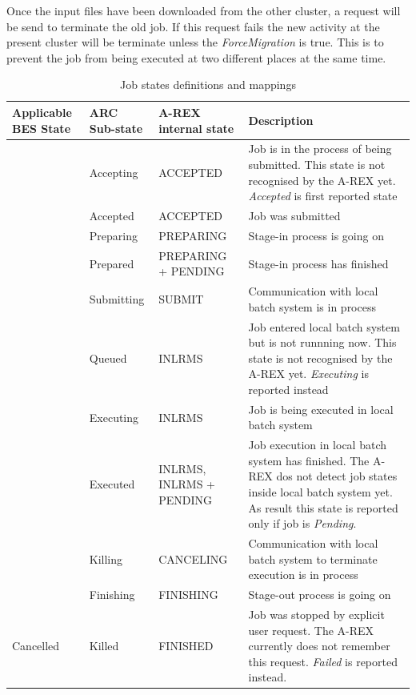 \documentclass{article}                            %
\begin{document}
Once the input files have been downloaded from the other cluster, a request will be send 
to terminate the old job. If this request fails the new activity at the present cluster 
will be terminate unless the \emph{ForceMigration} is true. This is to prevent the job 
from being executed at two different places at the same time.

%
\begin{table}

\caption{\label{tab:Job-states-definitions}Job states definitions and mappings}

\begin{tabular}{|>{\centering}p{}|>{\centering}p{}|>{\centering}p{}|p{}|}
\hline 
Applicable BES State&
ARC Sub-state&
A-REX internal state&
Description\tabularnewline
\hline
\hline 
\multirow{2}{*}{Pending}& Accepting& ACCEPTED &
Job is in the process of being submitted. This state is not recognised
by the A-REX yet. \emph{Accepted} is first reported state\\ \cline{2-4}
&Accepted& ACCEPTED& Job was submitted\\ \hline 
\multirow{8}{*}{Running}& Preparing& PREPARING& Stage-in process is going on\\ \cline{2-4} 
&Prepared& PREPARING + PENDING& Stage-in process has finished\\ \cline{2-4} 
&Submitting& SUBMIT& Communication with local batch system is in process\\ \cline{2-4} 
&Queued& INLRMS&
Job entered local batch system but is not runnning now. This state
is not recognised by the A-REX yet. \emph{Executing} is reported instead\\ \cline{2-4} 
&Executing& INLRMS& Job is being executed in local batch system\\ \cline{2-4} 
&Executed& INLRMS, INLRMS + PENDING&
Job execution in local batch system has finished. The A-REX dos not
detect job states inside local batch system yet. As result this state
is reported only if job is \emph{Pending}.\\ \cline{2-4} 
&Killing& CANCELING& Communication with local batch system to terminate execution is in process\\ \cline{2-4} 
&Finishing& FINISHING& Stage-out process is going on\\ \hline 
Cancelled& Killed& FINISHED&
Job was stopped by explicit user request. The A-REX currently does
not remember this request. \emph{Failed} is reported instead.\\ \hline 

\end{tabular}
\end{table}
\end{document}
